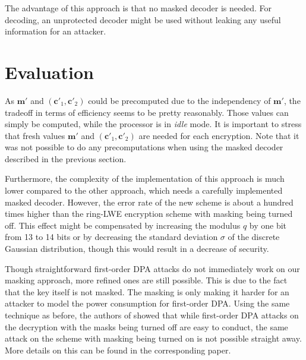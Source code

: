 The advantage of this approach is that no masked decoder is needed. For decoding, an unprotected decoder might be used without leaking any useful information for an attacker.

\section{Evaluation}
As \(\textbf{m}'\) and \((\textbf{c}'_1, \textbf{c}'_2)\) could be precomputed due to the independency of \(\textbf{m}'\), the tradeoff in terms of efficiency seems to be pretty reasonably. Those values can simply be computed, while the processor is in \textit{idle} mode. It is important to stress that fresh values \(\textbf{m}'\) and \((\textbf{c}'_1, \textbf{c}'_2)\) are needed for each encryption. Note that it was not possible to do any precomputations when using the masked decoder described in the previous section.

Furthermore, the complexity of the implementation of this approach is much lower compared to the other approach, which needs a carefully implemented masked decoder. However, the error rate of the new scheme is about a hundred times higher than the \ac{ring-LWE} encryption scheme with masking being turned off. This effect might be compensated by increasing the modulus \(q\) by one bit from 13 to 14 bits or by decreasing the standard deviation \(\sigma\) of the discrete Gaussian distribution, though this would result in a decrease of security.

Though straightforward first-order \ac{DPA} attacks do not immediately work on our masking approach, more refined ones are still possible. This is due to the fact that the key itself is not masked. The masking is only making it harder for an attacker to model the power consumption for first-order \ac{DPA}. Using the same technique as before, the authors of \cite{Reparaz2016} showed that while first-order \ac{DPA} attacks on the decryption with the masks being turned off are easy to conduct, the same attack on the scheme with masking being turned on is not possible straight away. More details on this can be found in the corresponding paper.


